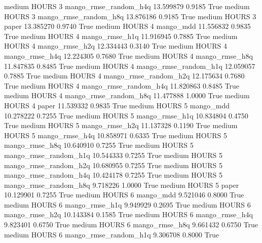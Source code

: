     medium    HOURS                 3 mango_rmse_random_h4q  13.599879      0.9185    True
    medium    HOURS                 3 mango_rmse_random_h8q  13.876186      0.9185    True
    medium    HOURS                 3                 paper  13.385270      0.9740    True
    medium    HOURS                 4             mango_mdd  11.556832      0.9835    True
    medium    HOURS                 4        mango_rmse_h1q  11.916945      0.7885    True
    medium    HOURS                 4        mango_rmse_h2q  12.334443      0.3140    True
    medium    HOURS                 4        mango_rmse_h4q  12.224305      0.7680    True
    medium    HOURS                 4        mango_rmse_h8q  11.847835      0.8485    True
    medium    HOURS                 4 mango_rmse_random_h1q  12.059057      0.7885    True
    medium    HOURS                 4 mango_rmse_random_h2q  12.175634      0.7680    True
    medium    HOURS                 4 mango_rmse_random_h4q  11.820863      0.8485    True
    medium    HOURS                 4 mango_rmse_random_h8q  11.477888      1.0000    True
    medium    HOURS                 4                 paper  11.539332      0.9835    True
    medium    HOURS                 5             mango_mdd  10.278222      0.7255    True
    medium    HOURS                 5        mango_rmse_h1q  10.834804      0.4750    True
    medium    HOURS                 5        mango_rmse_h2q  11.137328      0.1190    True
    medium    HOURS                 5        mango_rmse_h4q  10.858971      0.6335    True
    medium    HOURS                 5        mango_rmse_h8q  10.640910      0.7255    True
    medium    HOURS                 5 mango_rmse_random_h1q  10.544333      0.7255    True
    medium    HOURS                 5 mango_rmse_random_h2q  10.680955      0.7255    True
    medium    HOURS                 5 mango_rmse_random_h4q  10.424178      0.7255    True
    medium    HOURS                 5 mango_rmse_random_h8q   9.718226      1.0000    True
    medium    HOURS                 5                 paper  10.129901      0.7255    True
    medium    HOURS                 6             mango_mdd   9.521046      0.8000    True
    medium    HOURS                 6        mango_rmse_h1q   9.949929      0.2695    True
    medium    HOURS                 6        mango_rmse_h2q  10.143384      0.1585    True
    medium    HOURS                 6        mango_rmse_h4q   9.823401      0.6750    True
    medium    HOURS                 6        mango_rmse_h8q   9.661432      0.6750    True
    medium    HOURS                 6 mango_rmse_random_h1q   9.306708      0.8000    True
